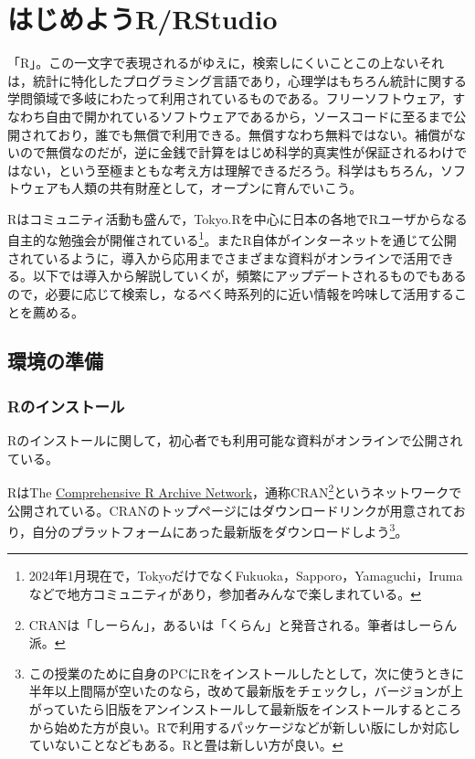 \documentclass[
  a4paper,
]{ltjsbook}
\begin{document}

\hypertarget{ux306fux3058ux3081ux3088ux3046rrstudio}{%
\chapter{はじめようR/RStudio}\label{ux306fux3058ux3081ux3088ux3046rrstudio}}

「R」。この一文字で表現されるがゆえに，検索しにくいことこの上ないそれは，統計に特化したプログラミング言語であり，心理学はもちろん統計に関する学問領域で多岐にわたって利用されているものである。フリーソフトウェア，すなわち自由で開かれているソフトウェアであるから，ソースコードに至るまで公開されており，誰でも無償で利用できる。無償すなわち無料ではない。補償がないので無償なのだが，逆に金銭で計算をはじめ科学的真実性が保証されるわけではない，という至極まともな考え方は理解できるだろう。科学はもちろん，ソフトウェアも人類の共有財産として，オープンに育んでいこう。

Rはコミュニティ活動も盛んで，Tokyo.Rを中心に日本の各地でRユーザからなる自主的な勉強会が開催されている\footnote{2024年1月現在で，TokyoだけでなくFukuoka，Sapporo，Yamaguchi，Irumaなどで地方コミュニティがあり，参加者みんなで楽しまれている。}。またR自体がインターネットを通じて公開されているように，導入から応用までさまざまな資料がオンラインで活用できる。以下では導入から解説していくが，頻繁にアップデートされるものでもあるので，必要に応じて検索し，なるべく時系列的に近い情報を吟味して活用することを薦める。

\hypertarget{ux74b0ux5883ux306eux6e96ux5099}{%
\section{環境の準備}\label{ux74b0ux5883ux306eux6e96ux5099}}

\hypertarget{rux306eux30a4ux30f3ux30b9ux30c8ux30fcux30eb}{%
\subsection{Rのインストール}\label{rux306eux30a4ux30f3ux30b9ux30c8ux30fcux30eb}}

Rのインストールに関して，初心者でも利用可能な資料がオンラインで公開されている。

RはThe \href{https://cran.r-project.org/}{Comprehensive R Archive
Network}，通称CRAN\footnote{CRANは「しーらん」，あるいは「くらん」と発音される。筆者はしーらん派。}というネットワークで公開されている。CRANのトップページにはダウンロードリンクが用意されており，自分のプラットフォームにあった最新版をダウンロードしよう\footnote{この授業のために自身のPCにRをインストールしたとして，次に使うときに半年以上間隔が空いたのなら，改めて最新版をチェックし，バージョンが上がっていたら旧版をアンインストールして最新版をインストールするところから始めた方が良い。Rで利用するパッケージなどが新しい版にしか対応していないことなどもある。Rと畳は新しい方が良い。}。
\end{document}
